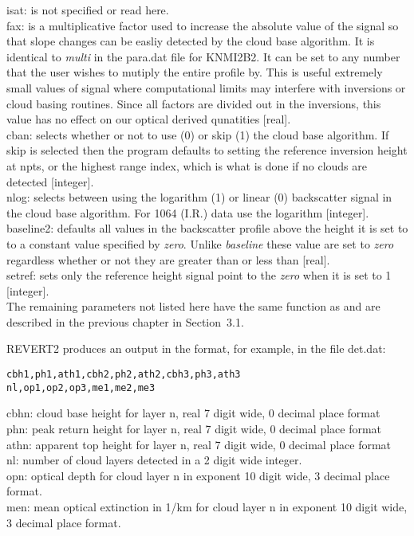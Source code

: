 \noindent
isat: is not specified or read here.\\
fax: is a multiplicative factor used to increase
the absolute value of the signal so that slope changes can be
easliy detected by the cloud base algorithm. It is identical 
to {\em multi} in the para.dat file for KNMI2B2. It can be set 
to any number that the user wishes to mutiply the entire profile by. 
This is useful extremely small values of signal where computational
limits may interfere with inversions or cloud basing routines. 
Since all factors are divided out in the inversions, this value 
has no effect on our optical derived qunatities [real].\\
cban: selects whether or not to use (0) or skip (1) 
the cloud base algorithm. If skip is selected then the program
defaults to setting the reference inversion height at npts, or
the highest range index, which is what is done if no clouds
are detected [integer].\\
nlog: selects between using the logarithm (1) or linear (0)
backscatter signal in the cloud base algorithm. For 1064 (I.R.)
data use the logarithm [integer].\\
baseline2: defaults all values in the backscatter profile above the height 
it is set to to a constant value specified by {\em zero}.  
Unlike {\em baseline} these value are set to {\em zero} regardless
whether or not they are greater than or less than [real].\\
setref: sets only the reference height signal point to the 
{\em zero} when it is set to 1 [integer].\\

\noindent
The remaining parameters not listed here have the same function as and
are described in the previous chapter in Section~{3.1}.

\noindent
REVERT2 produces an output in the format, for example, in the file det.dat:

\begin{center}
	{\tt cbh1,ph1,ath1,cbh2,ph2,ath2,cbh3,ph3,ath3\\
	nl,op1,op2,op3,me1,me2,me3}
\end{center}

\noindent
cbhn: cloud base height for layer n, real 7 digit wide, 0 decimal place format\\
phn: peak return height for layer n, real 7 digit wide, 0 decimal place format\\
athn: apparent top height for layer n, real 7 digit wide, 
      0 decimal place format\\ 
nl: number of cloud layers detected in a 2 digit wide integer.\\
opn: optical depth for cloud layer n in exponent 
     10 digit wide, 3 decimal place format.\\
men: mean optical extinction in 1/km for cloud layer n in exponent 
     10 digit wide, 3 decimal place format.\\

